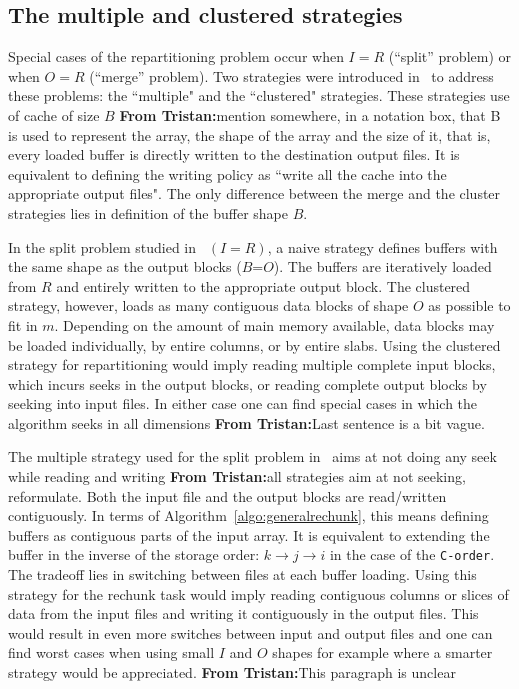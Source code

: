 \documentclass[conference]{IEEEtran}
\newcommand{\tristan}[1]{\color{orange}\textbf{From Tristan:}#1\color{black}}
\begin{document}
\subsection{The multiple and clustered strategies}
Special cases of the repartitioning problem occur when $I=R$ (``split'' problem)
or when $O=R$ (``merge'' problem). Two strategies were introduced
in~\cite{seqalgorithms} to address these problems: the ``multiple" and the
``clustered" strategies. These strategies
use of cache of size $B$ \tristan{mention somewhere, in a notation box,
that B is used to represent the array, the shape of the array and the size
of it}, that is, every loaded buffer is directly written to the
destination output files. It is equivalent to defining the writing policy
as ``write all the cache into the appropriate output files". The only difference
between the merge and the cluster strategies lies in definition of the buffer shape $B$.

In the split problem studied in~\cite{seqalgorithms} $(I=R)$, a naive
strategy defines buffers with the same shape as the output blocks
($B$=$O$). The buffers are iteratively loaded from $R$ and entirely written
to the appropriate output block. The clustered strategy, however, loads as
many contiguous data blocks of shape $O$ as possible to fit in $m$.
Depending on the amount of main memory available, data blocks may be loaded
individually, by entire columns, or by entire slabs. Using the clustered
strategy for repartitioning would imply reading multiple complete input
blocks, which incurs seeks in the output blocks, or reading complete output
blocks by seeking into input files. In either case one can find special
cases in which the algorithm seeks in all dimensions \tristan{Last sentence is a bit vague}.

The multiple strategy used for the split problem  in~\cite{seqalgorithms}
aims at not doing any seek while reading and writing \tristan{all strategies aim at not seeking, reformulate}.
Both the input file and the output blocks are read/written contiguously. In
terms of Algorithm~\ref{algo:generalrechunk}, this means defining buffers as
contiguous parts of the input array. It is equivalent to extending the buffer
in the inverse of the storage order: $k \rightarrow j \rightarrow i$ in the case
of the \texttt{C-order}. The tradeoff lies in switching between files
at each buffer loading. Using this strategy for the rechunk task would imply
reading contiguous columns or slices of data from the input files and writing it
contiguously in the output files. This would result in even more switches
between input and output files and one can find worst cases when using small
$I$ and $O$ shapes for example where a smarter strategy would be appreciated. \tristan{This paragraph is unclear}
\end{document}
